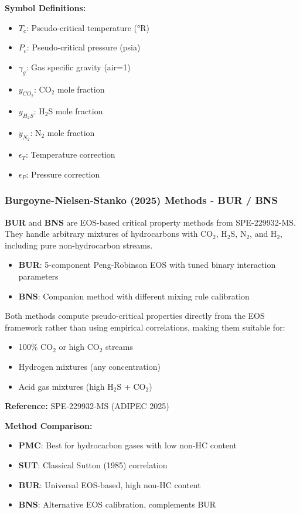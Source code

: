 \documentclass[11pt,a4paper]{article}
\newcommand{\symitem}[2]{\item \textbf{#1}: #2}
\begin{document}
\textbf{Symbol Definitions:}
\begin{itemize}[leftmargin=2cm]
\symitem{$T_c$}{Pseudo-critical temperature (°R)}
\symitem{$P_c$}{Pseudo-critical pressure (psia)}
\symitem{$\gamma_g$}{Gas specific gravity (air=1)}
\symitem{$y_{CO_2}$}{CO$_2$ mole fraction}
\symitem{$y_{H_2S}$}{H$_2$S mole fraction}
\symitem{$y_{N_2}$}{N$_2$ mole fraction}
\symitem{$\epsilon_T$}{Temperature correction}
\symitem{$\epsilon_P$}{Pressure correction}
\end{itemize}

\subsubsection{Burgoyne-Nielsen-Stanko (2025) Methods - BUR / BNS}

\begin{tcolorbox}[colback=formulabox,colframe=black!75]
\textbf{BUR} and \textbf{BNS} are EOS-based critical property methods from SPE-229932-MS. They handle arbitrary mixtures of hydrocarbons with CO$_2$, H$_2$S, N$_2$, and H$_2$, including pure non-hydrocarbon streams.

\begin{itemize}
\item \textbf{BUR}: 5-component Peng-Robinson EOS with tuned binary interaction parameters
\item \textbf{BNS}: Companion method with different mixing rule calibration
\end{itemize}

Both methods compute pseudo-critical properties directly from the EOS framework rather than using empirical correlations, making them suitable for:
\begin{itemize}
\item 100\% CO$_2$ or high CO$_2$ streams
\item Hydrogen mixtures (any concentration)
\item Acid gas mixtures (high H$_2$S + CO$_2$)
\end{itemize}

\textbf{Reference:} SPE-229932-MS (ADIPEC 2025)
\end{tcolorbox}

\textbf{Method Comparison:}
\begin{itemize}
\item \textbf{PMC}: Best for hydrocarbon gases with low non-HC content
\item \textbf{SUT}: Classical Sutton (1985) correlation
\item \textbf{BUR}: Universal EOS-based, high non-HC content
\item \textbf{BNS}: Alternative EOS calibration, complements BUR
\end{itemize}
\end{document}
